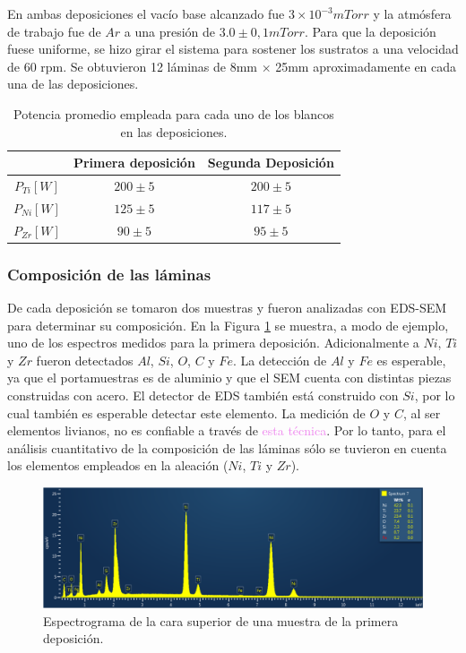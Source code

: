 \documentclass[12pt]{article}
\theoremstyle{definition}
\theoremstyle{remark}
\begin{document}
{En ambas deposiciones el vacío base alcanzado fue $3 \times 10^{-3}mTorr$ y la atmósfera de trabajo fue de $Ar$ a una presión de $3.0 \pm 0,1 mTorr$. Para que la deposición fuese uniforme, se hizo girar el sistema para sostener los sustratos a una velocidad de 60 rpm. Se obtuvieron 12 láminas de 8mm $\times$ 25mm aproximadamente en cada una de las deposiciones.

\begin{table}[H]
\centering
\begin{tabular}{|c|c|c|}
\hline
 & Primera deposición  & Segunda Deposición \\ \hline
$P_{Ti}[W]$ & $200 \pm 5$ & $200 \pm 5$ \\ \hline
$P_{Ni}[W]$ & $125 \pm 5$ & $117 \pm 5$ \\ \hline
$P_{Zr}[W]$ & $90 \pm 5$ & $95 \pm 5$ \\ \hline
\end{tabular}
\caption{Potencia promedio empleada para cada uno de los blancos en las deposiciones.}
\label{potencias}
\end{table}

\subsubsection{Composición de las láminas}

De cada deposición se tomaron dos muestras y fueron analizadas con EDS-SEM para determinar su composición. En la Figura \ref{dep2} se muestra, a modo de ejemplo, uno de los espectros medidos para la primera deposición. Adicionalmente a $Ni$, $Ti$ y $Zr$ fueron detectados $Al$, $Si$, $O$, $C$ y $Fe$. La detección de $Al$ y $Fe$ es esperable, ya que el portamuestras es de aluminio y que el SEM cuenta con distintas piezas construidas con acero. El detector de EDS también está construido con $Si$, por lo cual también es esperable detectar este elemento. La medición de $O$ y $C$, al ser elementos livianos, no es confiable a través de \textcolor{violet}{esta técnica}. Por lo tanto, para el análisis cuantitativo de la composición de las láminas sólo se tuvieron en cuenta los elementos empleados en la aleación ($Ni$, $Ti$ y $Zr$).

 \begin{figure}[H]
 	\centering
	\includegraphics[scale=0.5]{img/SEMAllElements.png}
 	\caption{Espectrograma de la cara superior de una muestra de la primera deposición.}
	\label{dep2}
\end{figure} 

}
\end{document}
